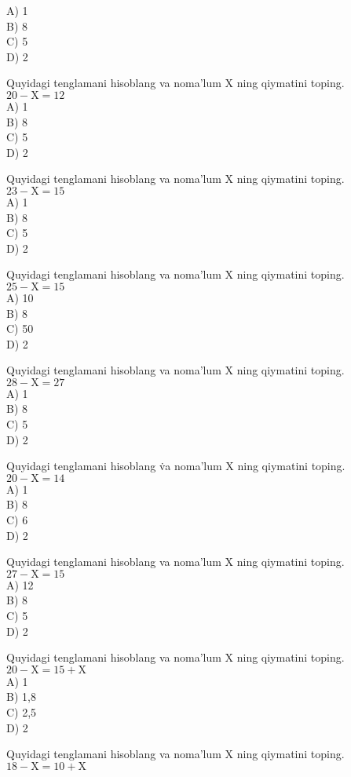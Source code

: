A) 1\\
B) 8\\
C) 5\\
D) 2
  \item Quyidagi tenglamani hisoblang va noma'lum X ning qiymatini toping. $20-\mathrm{X}=12$\\
A) 1\\
B) 8\\
C) 5\\
D) 2
  \item Quyidagi tenglamani hisoblang va noma'lum X ning qiymatini toping. $23-\mathrm{X}=15$\\
A) 1\\
B) 8\\
C) 5\\
D) 2
  \item Quyidagi tenglamani hisoblang va noma'lum X ning qiymatini toping. $25-\mathrm{X}=15$\\
A) 10\\
B) 8\\
C) 50\\
D) 2
  \item Quyidagi tenglamani hisoblang va noma'lum X ning qiymatini toping. $28-\mathrm{X}=27$\\
A) 1\\
B) 8\\
C) 5\\
D) 2
  \item Quyidagi tenglamani hisoblang v̇a noma'lum X ning qiymatini toping. $20-\mathrm{X}=14$\\
A) 1\\
B) 8\\
C) 6\\
D) 2
  \item Quyidagi tenglamani hisoblang va noma'lum X ning qiymatini toping. $27-\mathrm{X}=15$\\
A) 12\\
B) 8\\
C) 5\\
D) 2
  \item Quyidagi tenglamani hisoblang va noma'lum X ning qiymatini toping. $20-\mathrm{X}=15+\mathrm{X}$\\
A) 1\\
B) 1,8\\
C) 2,5\\
D) 2
  \item Quyidagi tenglamani hisoblang va noma'lum X ning qiymatini toping. $18-\mathrm{X}=10+\mathrm{X}$\\
